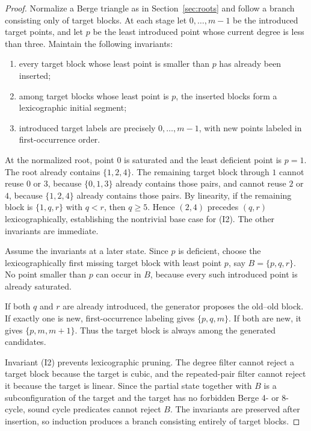 \documentclass[11pt]{article}
\theoremstyle{remark}
\begin{document}
\begin{proof}
Normalize a Berge triangle as in Section~\ref{sec:roots} and follow a branch consisting only of target blocks.  At each stage let \(0,\ldots,m-1\) be the introduced target points, and let \(p\) be the least introduced point whose current degree is less than three.  Maintain the following invariants:
\begin{enumerate}
\item[(I1)] every target block whose least point is smaller than \(p\) has already been inserted;
\item[(I2)] among target blocks whose least point is \(p\), the inserted blocks form a lexicographic initial segment;
\item[(I3)] introduced target labels are precisely \(0,\ldots,m-1\), with new points labeled in first-occurrence order.
\end{enumerate}

At the normalized root, point \(0\) is saturated and the least deficient point is \(p=1\).  The root already contains \(\{1,2,4\}\).  The remaining target block through \(1\) cannot reuse \(0\) or \(3\), because \(\{0,1,3\}\) already contains those pairs, and cannot reuse \(2\) or \(4\), because \(\{1,2,4\}\) already contains those pairs.  By linearity, if the remaining block is \(\{1,q,r\}\) with \(q<r\), then \(q\ge 5\).  Hence \((2,4)\) precedes \((q,r)\) lexicographically, establishing the nontrivial base case for (I2).  The other invariants are immediate.

Assume the invariants at a later state.  Since \(p\) is deficient, choose the lexicographically first missing target block with least point \(p\), say \(B=\{p,q,r\}\).  No point smaller than \(p\) can occur in \(B\), because every such introduced point is already saturated.

If both \(q\) and \(r\) are already introduced, the generator proposes the old--old block.  If exactly one is new, first-occurrence labeling gives \(\{p,q,m\}\).  If both are new, it gives \(\{p,m,m+1\}\).  Thus the target block is always among the generated candidates.

Invariant (I2) prevents lexicographic pruning.  The degree filter cannot reject a target block because the target is cubic, and the repeated-pair filter cannot reject it because the target is linear.  Since the partial state together with \(B\) is a subconfiguration of the target and the target has no forbidden Berge 4- or 8-cycle, sound cycle predicates cannot reject \(B\).  The invariants are preserved after insertion, so induction produces a branch consisting entirely of target blocks.


\end{proof}
\end{document}
